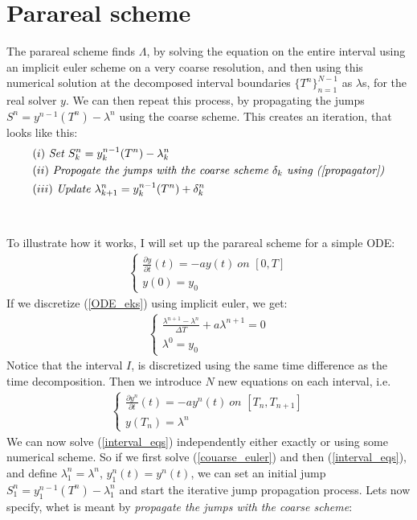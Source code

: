 \section{Parareal scheme}
The parareal scheme finds $\Lambda$, by solving the equation on the entire interval using an implicit euler scheme on a very coarse resolution, and then using this numerical solution at the decomposed interval boundaries $\{T^n\}_{n=1}^{N-1}$ as $\lambda$s, for the real solver $y$. We can then repeat this process, by propagating the jumps $S^n=y^{n-1}(T^n)-\lambda^n$ using the coarse scheme. This creates an iteration, that looks like this:
\begin{align*}
&(i) \ \textit{Set $S^n_k = y_k^{n-1}(T^n)-\lambda_k^n$} \\
&(ii) \ \textit{Propogate the jumps with the coarse scheme $\delta_k$ using (\ref{propagator})} \\
&(iii) \ \textit{Update $\lambda_{k+1}^n=y_k^{n-1}(T^n) + \delta_k^n$}
\end{align*} 
\\
\\
To illustrate how it works, I will set up the parareal scheme for a simple ODE:
\begin{align}
\left\{
     \begin{array}{lr}
		\frac{\partial y}{\partial t}(t)=-ay(t) \ 				\textit{on $[0,T]$} \\
		y(0)=y_0
	\end{array}
\right.	\label{ODE_eks}
\end{align}
If we discretize (\ref{ODE_eks}) using implicit euler, we get:
\begin{align}
\left\{
     \begin{array}{lr}
		\frac{\lambda^{n+1}-\lambda^{n}}{\Delta T}+a\lambda^{n+1}=0  \\
		\lambda^0=y_0
	\end{array}
\right.	\label{couarse_euler}
\end{align}
Notice that the interval $I$, is discretized using the same time difference as the time decomposition. Then we introduce $N$ new equations on each interval, i.e.
\begin{align}
\left\{
     \begin{array}{lr}
		\frac{\partial y^n}{\partial t}(t)=-ay^n(t) \ 				\textit{on $[T_n,T_{n+1}]$} \\
		y(T_n)=\lambda^n
	\end{array}
\right. \label{interval_eqs}
\end{align}
We can now solve (\ref{interval_eqs}) independently either exactly or using some numerical scheme. So if we first solve (\ref{couarse_euler}) and then (\ref{interval_eqs}), and define $\lambda_1^n=\lambda^n$, $y_1^n(t)=y^n(t)$, we can set an initial jump $S_1^n=y_1^{n-1}(T^n)-\lambda_1^n$ and start the iterative jump propagation process. Lets now specify, whet is meant by \textit{propagate the jumps with the coarse scheme}:
